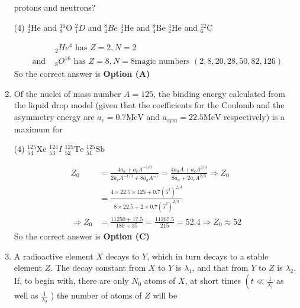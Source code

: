 \begin{enumerate}
	protons and neutrons?
{	}
\begin{tasks}(4)
\task[\textbf{A.}] ${ }_{2}^{4} \mathrm{He}$ and ${ }_{8}^{16} \mathrm{O}$
\task[\textbf{B.}] ${ }_{1}^{2} D$ and ${ }_{4}^{8} B e$
\task[\textbf{C.}]  ${ }_{2}^{4} \mathrm{He}$ and ${ }_{4}^{8} \mathrm{Be}$
\task[\textbf{D.}] ${ }_{2}^{4} \mathrm{He}$ and ${ }_{6}^{12} \mathrm{C}$
\end{tasks}
\begin{answer}
\begin{align*}
&{ }_{2} H e^{4}\text{ has }Z=2, N=2\\
\text{	and }&{ }_{8} O^{16}\text{ has }Z=8, N=8 \text{magic numbers }(2,8,20,28,50,82,126)
\end{align*}
So the correct answer is \textbf{Option (A)}
\end{answer}
\item 	Of the nuclei of mass number $A=125$, the binding energy calculated from the liquid drop model (given that the coefficients for the Coulomb and the asymmetry energy are $a_{c}=0.7 \mathrm{MeV}$ and $a_{\mathrm{sym}}=22.5 \mathrm{MeV}$ respectively) is a maximum for
{}
\begin{tasks}(4)
\task[\textbf{A.}] ${ }_{54}^{125} \mathrm{Xe}$
\task[\textbf{B.}] ${ }_{53}^{124} I$
\task[\textbf{C.}] ${ }_{52}^{125} \mathrm{Te}$
\task[\textbf{D.}] ${ }_{51}^{125} \mathrm{Sb}$
\end{tasks}
\begin{answer}
\begin{align*}
Z_{0}&=\frac{4 a_{a}+a_{c} A^{-1 / 3}}{2 a_{c} A^{-1 / 3}+8 a_{a} A^{-1}}=\frac{4 a_{a} A+a_{c} A^{2 / 3}}{8 a_{a}+2 a_{c} A^{2 / 3}} \Rightarrow Z_{0}\\&=\frac{4 \times 22.5 \times 125+0.7\left(5^{3}\right)^{2 / 3}}{8 \times 22.5+2 \times 0.7\left(5^{3}\right)^{2 / 3}}\\
\Rightarrow Z_{0}&=\frac{11250+17.5}{180+35}=\frac{11267.5}{215}=52.4 \Rightarrow Z_{0} \approx 52
\end{align*}
So the correct answer is \textbf{Option (C)}
\end{answer}
	\item A radioactive element $X$ decays to $Y$, which in turn decays to a stable element $Z$. The decay constant from $X$ to $Y$ is $\lambda_{1}$, and that from $Y$ to $Z$ is $\lambda_{2} .$ If, to begin with, there are only $N_{0}$ atoms of $X$, at short times $\left(t \ll \frac{1}{\lambda_{1}}\right.$ as well as $\frac{1}{\lambda_{2}}$ ) the number of atoms of $Z$ will be

\end{enumerate}
